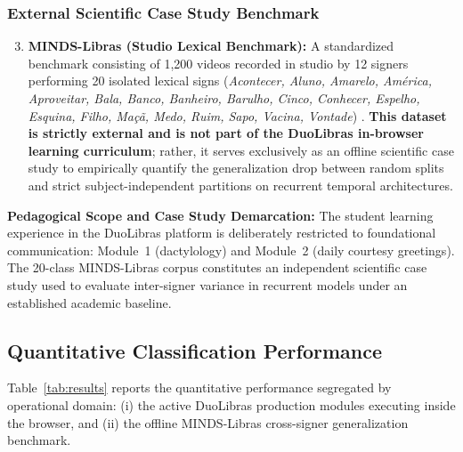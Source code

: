 \documentclass[12pt,a4paper]{article}
\begin{document}
\subsubsection{External Scientific Case Study Benchmark}
\begin{enumerate}
    \setcounter{enumi}{2}
    \item \textbf{MINDS-Libras (Studio Lexical Benchmark):} A standardized benchmark consisting of 1,200 videos recorded in studio by 12 signers performing 20 isolated lexical signs (\textit{Acontecer, Aluno, Amarelo, Am\'erica, Aproveitar, Bala, Banco, Banheiro, Barulho, Cinco, Conhecer, Espelho, Esquina, Filho, Ma\c{c}\~a, Medo, Ruim, Sapo, Vacina, Vontade}) \citep{rezende2021minds}. \textbf{This dataset is strictly external and is not part of the DuoLibras in-browser learning curriculum}; rather, it serves exclusively as an offline scientific case study to empirically quantify the generalization drop between random splits and strict subject-independent partitions on recurrent temporal architectures.
\end{enumerate}

\noindent\textbf{Pedagogical Scope and Case Study Demarcation:} The student learning experience in the DuoLibras platform is deliberately restricted to foundational communication: Module~1 (dactylology) and Module~2 (daily courtesy greetings). The 20-class MINDS-Libras corpus constitutes an independent scientific case study used to evaluate inter-signer variance in recurrent models under an established academic baseline.

\subsection{Quantitative Classification Performance}

Table~\ref{tab:results} reports the quantitative performance segregated by operational domain: (i) the active DuoLibras production modules executing inside the browser, and (ii) the offline MINDS-Libras cross-signer generalization benchmark.
\end{document}
